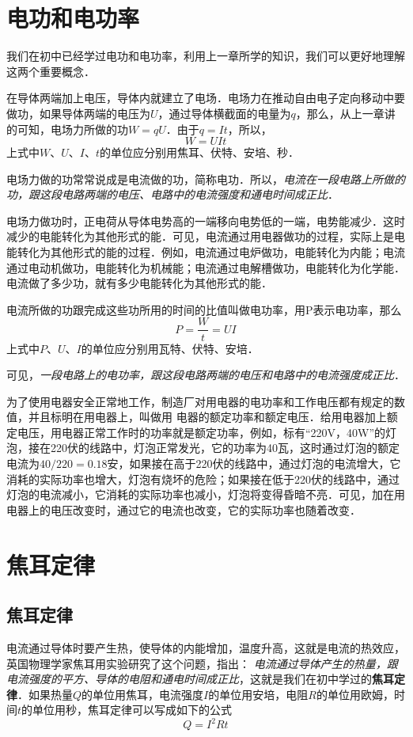 \section{电功和电功率}
我们在初中已经学过电功和电功率，利用上一章所学的知识，我们可以更好地理解这两个重要概念．

在导体两端加上电压，导体内就建立了电场．电场力在推动自由电子定向移动中要做功，如果导体两端的电压为$U$，通过导体横截面的电量为$q$，那么，从上一章讲的可知，电场力所做的功$W=qU$．由于$q=It$，所以，
\[W=UIt\]
上式中$W$、$U$、$I$、$t$的单位应分别用焦耳、伏特、安培、秒．

电场力做的功常常说成是电流做的功，简称电功．所以，\textit{电流在一段电路上所做的功，跟这段电路两端的电压、电路中的电流强度和通电时间成正比}．

电场力做功时，正电荷从导体电势高的一端移向电势低的一端，电势能减少．这时减少的电能转化为其他形式的能．可见，电流通过用电器做功的过程，实际上是电能转化为其他形式的能的过程．例如，电流通过电炉做功，电能转化为内能；电流通过电动机做功，电能转化为机械能；电流通过电解槽做功，电能转化为化学能．电流做了多少功，就有多少电能转化为其他形式的能．

电流所做的功跟完成这些功所用的时间的比值叫做电功率，用P表示电功率，那么
\[P=\frac{W}{t}=UI\]
上式中$P$、$U$、$I$的单位应分别用瓦特、伏特、安培．

可见，\textit{一段电路上的电功率，跟这段电路两端的电压和电路中的电流强度成正比}．

为了使用电器安全正常地工作，制造厂对用电器的电功率和工作电压都有规定的数值，并且标明在用电器上，叫做用
电器的额定功率和额定电压．给用电器加上额定电压，用电器正常工作时的功率就是额定功率，例如，标有“220V，40W”的灯泡，接在220伏的线路中，灯泡正常发光，它的功率为40瓦，这时通过灯泡的额定电流为$40/220=0.18$安，如果接在高于220伏的线路中，通过灯泡的电流增大，它消耗的实际功率也增大，灯泡有烧坏的危险；如果接在低于220伏的线路中，通过灯泡的电流减小，它消耗的实际功率也减小，灯泡将变得昏暗不亮．可见，加在用电器上的电压改变时，通过它的电流也改变，它的实际功率也随着改变．

\section{焦耳定律}
\subsection{焦耳定律}


电流通过导体时要产生热，使导体的内能增加，温度升高，这就是电流的热效应，英国物理学家焦耳用实验研究了这个问题，指出：
\textit{电流通过导体产生的热量，跟电流强度的平方、导体的电阻和通电时间成正比}，这就是我们在初中学过的\textbf{焦耳定律}．如果热量$Q$的单位用焦耳，电流强度$I$的单位用安培，电阻$R$的单位用欧姆，时间$t$的单位用秒，焦耳定律可以写成如下的公式
\[Q=I^2Rt\]

